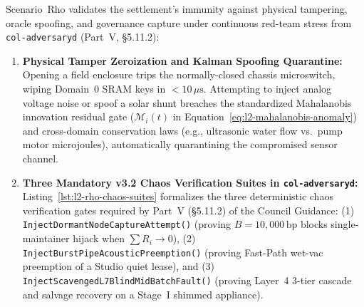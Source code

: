 Scenario~Rho validates the settlement's immunity against physical tampering, oracle spoofing, and governance capture under continuous red-team stress from \texttt{col-adversaryd} (Part~V, \S5.11.2):
\begin{enumerate}
    \item \textbf{Physical Tamper Zeroization and Kalman Spoofing Quarantine:} Opening a field enclosure trips the normally-closed chassis microswitch, wiping Domain~0 SRAM keys in $< 10\,\mu\mathrm{s}$. Attempting to inject analog voltage noise or spoof a solar shunt breaches the standardized Mahalanobis innovation residual gate ($\mathcal{M}_i(t)$ in Equation~\eqref{eq:l2-mahalanobis-anomaly}) and cross-domain conservation laws (e.g., ultrasonic water flow vs.\ pump motor microjoules), automatically quarantining the compromised sensor channel.
    \item \textbf{Three Mandatory v3.2 Chaos Verification Suites in \texttt{col-adversaryd}:} Listing~\ref{lst:l2-rho-chaos-suites} formalizes the three deterministic chaos verification gates required by Part~V (\S5.11.2) of the Council Guidance: (1) \texttt{InjectDormantNodeCaptureAttempt()} (proving $B = 10{,}000\,\mathrm{bp}$ blocks single-maintainer hijack when $\sum R_i \to 0$), (2) \texttt{InjectBurstPipeAcousticPreemption()} (proving Fast-Path wet-vac preemption of a Studio quiet lease), and (3) \texttt{InjectScavengedL7BlindMidBatchFault()} (proving Layer~4 3-tier cascade and salvage recovery on a Stage~I shimmed appliance).
\end{enumerate}

